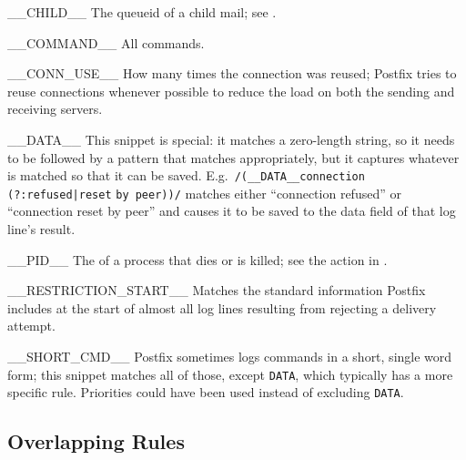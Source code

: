 \begin{eqlist}

    \squeezeitems{}

    \item [\_\_CHILD\_\_]  The queueid of a child mail; see
        .

    \item [\_\_COMMAND\_\_]  All  commands.

    \item [\_\_CONN\_USE\_\_]  How many times the connection was reused;
        Postfix tries to reuse connections whenever possible to reduce the
        load on both the sending and receiving servers.

    \item [\_\_DATA\_\_]  This snippet is special: it matches a zero-length
        string, so it needs to be followed by a pattern that matches
        appropriately, but it captures whatever is matched so that it can
        be saved.  E.g.\ \verb!/(__DATA__connection (?:refused|reset!
        \newline{} \tab{}\verb!by peer))/! matches either ``connection
        refused'' or ``connection reset by peer'' and causes it to be saved
        to the data field of that log line's result.

    \item [\_\_PID\_\_]  The  of a  process that
        dies or is killed; see the  action in
        .

    \item [\_\_RESTRICTION\_START\_\_]  Matches the standard information
        Postfix includes at the start of almost all log lines resulting
        from rejecting a delivery attempt.

    \item [\_\_SHORT\_CMD\_\_]  Postfix sometimes logs 
        commands in a short, single word form; this snippet matches all of
        those, except \texttt{DATA}, which typically has a more specific
        rule.  Priorities could have been used instead of excluding
        \texttt{DATA}.


\end{eqlist}

\subsection{Overlapping Rules}

